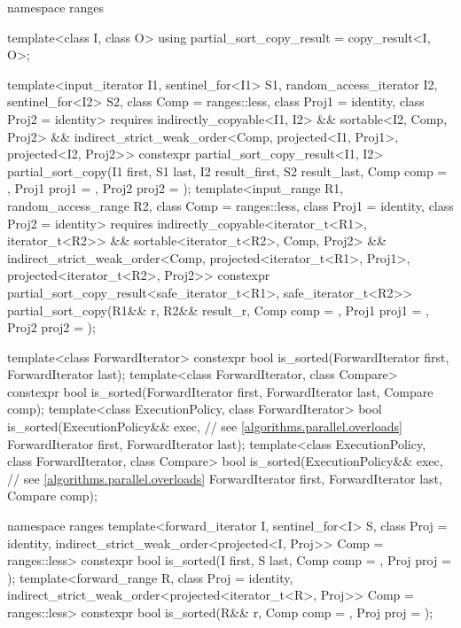 \begin{codeblock}
{  namespace ranges {
    template<class I, class O> using partial_sort_copy_result = copy_result<I, O>;

    template<input_iterator I1, sentinel_for<I1> S1,
             random_access_iterator I2, sentinel_for<I2> S2,
             class Comp = ranges::less, class Proj1 = identity, class Proj2 = identity>
      requires indirectly_copyable<I1, I2> && sortable<I2, Comp, Proj2> &&
               indirect_strict_weak_order<Comp, projected<I1, Proj1>, projected<I2, Proj2>>
      constexpr partial_sort_copy_result<I1, I2>
        partial_sort_copy(I1 first, S1 last, I2 result_first, S2 result_last,
                          Comp comp = {}, Proj1 proj1 = {}, Proj2 proj2 = {});
    template<input_range R1, random_access_range R2, class Comp = ranges::less,
             class Proj1 = identity, class Proj2 = identity>
      requires indirectly_copyable<iterator_t<R1>, iterator_t<R2>> &&
               sortable<iterator_t<R2>, Comp, Proj2> &&
               indirect_strict_weak_order<Comp, projected<iterator_t<R1>, Proj1>,
                                          projected<iterator_t<R2>, Proj2>>
      constexpr partial_sort_copy_result<safe_iterator_t<R1>, safe_iterator_t<R2>>
        partial_sort_copy(R1&& r, R2&& result_r, Comp comp = {},
                          Proj1 proj1 = {}, Proj2 proj2 = {});
  }

  template<class ForwardIterator>
    constexpr bool is_sorted(ForwardIterator first, ForwardIterator last);
  template<class ForwardIterator, class Compare>
    constexpr bool is_sorted(ForwardIterator first, ForwardIterator last,
                             Compare comp);
  template<class ExecutionPolicy, class ForwardIterator>
    bool is_sorted(ExecutionPolicy&& exec,                      // see \ref{algorithms.parallel.overloads}
                   ForwardIterator first, ForwardIterator last);
  template<class ExecutionPolicy, class ForwardIterator, class Compare>
    bool is_sorted(ExecutionPolicy&& exec,                      // see \ref{algorithms.parallel.overloads}
                   ForwardIterator first, ForwardIterator last,
                   Compare comp);

  namespace ranges {
    template<forward_iterator I, sentinel_for<I> S, class Proj = identity,
             indirect_strict_weak_order<projected<I, Proj>> Comp = ranges::less>
      constexpr bool is_sorted(I first, S last, Comp comp = {}, Proj proj = {});
    template<forward_range R, class Proj = identity,
             indirect_strict_weak_order<projected<iterator_t<R>, Proj>> Comp = ranges::less>
      constexpr bool is_sorted(R&& r, Comp comp = {}, Proj proj = {});
  }

}
\end{codeblock}
